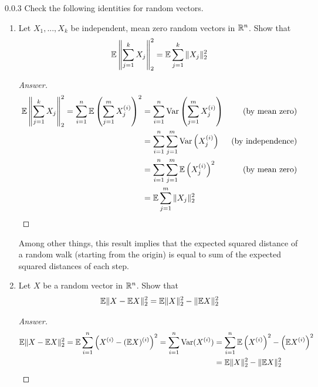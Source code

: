 \begin{ex}{0.0.3}\label{0.0.3} Check the following identities for random vectors.
\begin{enumerate}[label=(\alph*)]

\item Let $X_1,...,X_k$ be independent, mean zero random vectors in $\mathbb{R}^n$. Show that
\begin{align*}
    \mathbb{E} \left\|\sum_{j=1}^k X_j\right\|_2^2 = \mathbb{E} \sum_{j=1}^k \|X_j\|_2^2
\end{align*}

\begin{proof}[Answer]
\begin{align*}
    \mathbb{E} \left\|\sum_{j=1}^k X_j\right\|_2^2 = \sum_{i=1}^n \mathbb{E} \left(\sum_{j=1}^m X_j^{(i)}\right)^2 &= \sum_{i=1}^n \text{Var}\left(\sum_{j=1}^m X_j^{(i)}\right) &\text{(by mean zero)} \\
    &= \sum_{i=1}^n \sum_{j=1}^m \text{Var}\left( X_j^{(i)}\right) &\text{(by independence)} \\
    &= \sum_{i=1}^n \sum_{j=1}^m\mathbb{E} \left(X_j^{(i)}\right)^2  &\text{(by mean zero)} \\
    &= \mathbb{E}\sum_{j=1}^m \|X_j\|_2^2 
\end{align*}
\end{proof}

Among other things, this result implies that the expected squared distance of a random walk (starting from the origin) is equal to sum of the expected squared distances of each step.

\item Let $X$ be a random vector in $\mathbb{R}^n$. Show that
\begin{align*}
    \mathbb{E} \|X - \mathbb{E} X\|_2^2 = \mathbb{E}\|X\|_2^2 - \|\mathbb{E} X \|^2_2
\end{align*}

\begin{proof}[Answer]
\begin{align*}
    \mathbb{E} \|X - \mathbb{E} X \|_2^2 = \mathbb{E} \sum_{i=1}^n \left(X^{(i)}-(\mathbb{E} X)^{(i)}\right)^2 = \sum_{i=1}^n \text{Var}(X^{(i)}) &= \sum_{i=1}^n\mathbb{E} \left(X^{(i)}\right)^2 - \left(\mathbb{E} X^{(i)}\right)^2 \\
    &= \mathbb{E} \|X\|_2^2- \|\mathbb{E} X\|_2^2
\end{align*}
\end{proof}

\end{enumerate}
\end{ex}

